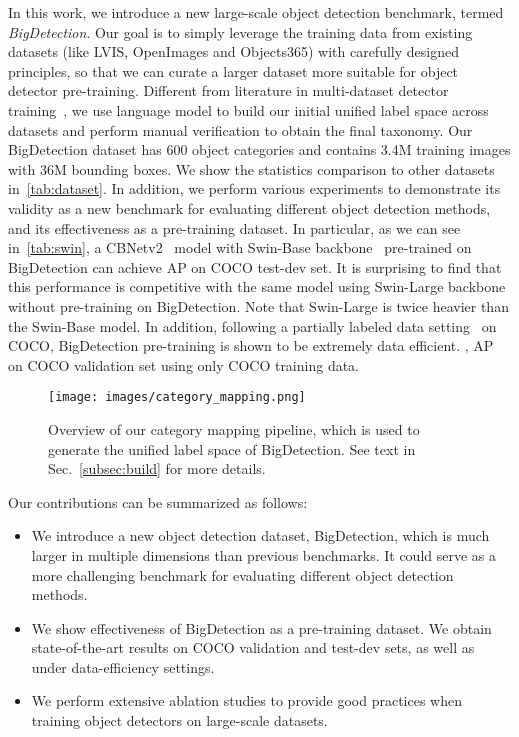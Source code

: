 \documentclass[10pt,twocolumn,letterpaper]{article}
\begin{document}
 
In this work, we introduce a new large-scale object detection benchmark, termed \textit{BigDetection}. Our goal is to simply leverage the training data from existing datasets (like LVIS, OpenImages and Objects365)  with carefully designed principles, so that we can curate a larger dataset more suitable for object detector pre-training.
Different from literature in multi-dataset detector training~\cite{wang2019towards, zhou2021simple, zhao2020object}, we use language model to build our initial unified label space across datasets and perform manual verification to obtain the final taxonomy. 
Our BigDetection dataset has 600 object categories and contains 3.4M training images with 36M bounding boxes. We show the statistics comparison to other datasets in~\cref{tab:dataset}.
In addition, we perform various experiments to demonstrate its validity as a new benchmark for evaluating different object detection methods, and its effectiveness as a pre-training dataset.
In particular, as we can see in~\cref{tab:swin}, a CBNetv2~\cite{liang2021cbnetv2} model with Swin-Base backbone~\cite{liu2021swin} pre-trained on BigDetection can achieve  AP on COCO test-dev set. It is surprising to find that this performance is competitive with the same model using Swin-Large backbone without pre-training on BigDetection. Note that Swin-Large is twice heavier than the Swin-Base model.
In addition, following a partially labeled data setting~\cite{sohn2020simple} on COCO, BigDetection pre-training is shown to be extremely data efficient. \eg,  AP on COCO validation set using only  COCO training data.

\begin{figure}[t]
  \centering
  \texttt{[image: images/category\_mapping.png]}
  \caption{Overview of our category mapping pipeline, which is used to generate the unified label space of BigDetection. See text in Sec.~\ref{subsec:build} for  more details.}
  \label{fig:cat_mapping}
  \vspace{-2ex}
\end{figure} Our contributions can be summarized as follows:
\begin{itemize}
    \item We introduce a new object detection dataset, BigDetection, which is much larger in multiple dimensions than previous benchmarks. It could serve as a more challenging benchmark for evaluating different object detection methods.
    \item We show effectiveness of BigDetection as a pre-training dataset. We obtain state-of-the-art results on COCO validation and test-dev sets, as well as under data-efficiency settings.
    \item We perform extensive ablation studies to provide good practices when training object detectors on large-scale datasets. 
\end{itemize}
\end{document}
